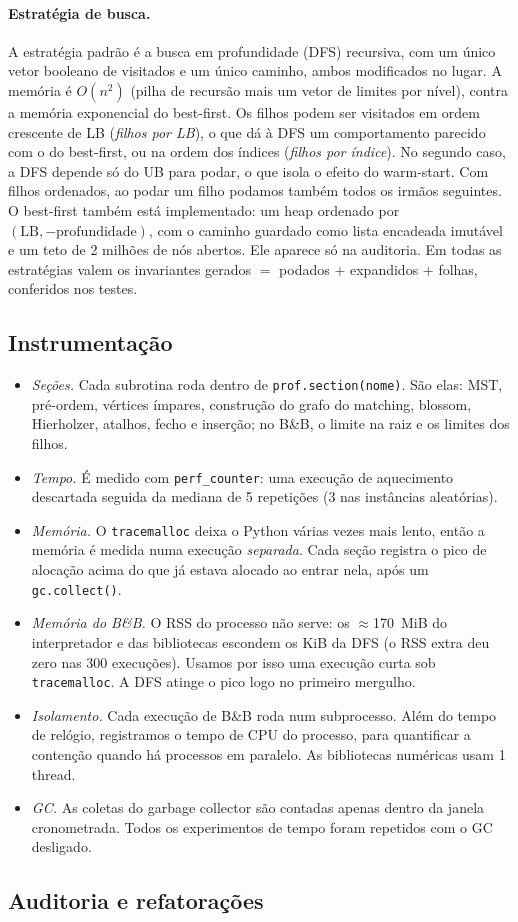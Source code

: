 \paragraph{Estratégia de busca.} A estratégia padrão é a busca em
profundidade (DFS) recursiva, com um único vetor booleano de visitados e um
único caminho, ambos modificados no lugar. A memória é $O(n^2)$ (pilha de
recursão mais um vetor de limites por nível), contra a memória exponencial
do best-first. Os filhos podem ser visitados em ordem crescente de LB
(\emph{filhos por LB}), o que dá à DFS um comportamento parecido com o do
best-first, ou na ordem dos índices (\emph{filhos por índice}). No segundo
caso, a DFS depende só do UB para podar, o que isola o efeito do warm-start.
Com filhos ordenados, ao podar um filho podamos também todos os irmãos
seguintes. O best-first também está implementado: um heap ordenado por
$(\mathrm{LB},-\text{profundidade})$, com o caminho guardado como lista
encadeada imutável e um teto de 2 milhões de nós abertos. Ele aparece só na
auditoria. Em todas as estratégias valem os invariantes
gerados $=$ podados $+$ expandidos $+$ folhas, conferidos nos testes.

\subsection{Instrumentação}
\begin{itemize}
  \item \emph{Seções.} Cada subrotina roda dentro de
    \texttt{prof.section(nome)}. São elas: MST, pré-ordem, vértices ímpares,
    construção do grafo do matching, blossom, Hierholzer, atalhos, fecho e
    inserção; no B\&B, o limite na raiz e os limites dos filhos.
  \item \emph{Tempo.} É medido com \texttt{perf\_counter}: uma execução de
    aquecimento descartada seguida da mediana de 5 repetições (3 nas
    instâncias aleatórias).
  \item \emph{Memória.} O \texttt{tracemalloc} deixa o Python várias vezes
    mais lento, então a memória é medida numa execução \emph{separada}. Cada
    seção registra o pico de alocação acima do que já estava alocado ao
    entrar nela, após um \texttt{gc.collect()}.
  \item \emph{Memória do B\&B.} O RSS do processo não serve: os
    $\approx$170~MiB do interpretador e das bibliotecas escondem os KiB da
    DFS (o RSS extra deu zero nas 300 execuções). Usamos por isso uma
    execução curta sob \texttt{tracemalloc}. A DFS atinge o pico logo no
    primeiro mergulho.
  \item \emph{Isolamento.} Cada execução de B\&B roda num subprocesso. Além
    do tempo de relógio, registramos o tempo de CPU do processo, para
    quantificar a contenção quando há processos em paralelo. As bibliotecas
    numéricas usam 1 thread.
  \item \emph{GC.} As coletas do garbage collector são contadas apenas
    dentro da janela cronometrada. Todos os experimentos de tempo foram
    repetidos com o GC desligado.
\end{itemize}

\subsection{Auditoria e refatorações}\label{sec:auditoria}


